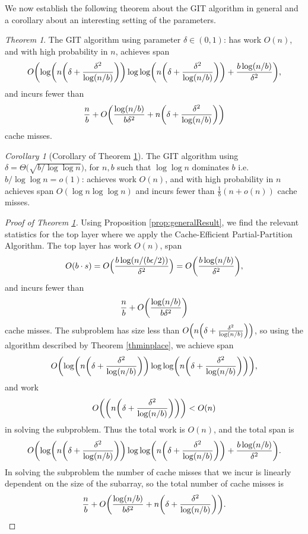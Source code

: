 \documentclass[sigconf]{acmart}
\DeclarePairedDelimiter{\paren}{(}{)}
\theoremstyle{remark}
\newtheorem{theorem}{Theorem}[section]
\newtheorem{corollary}[thm]{Corollary}
\theoremstyle{remark}
\begin{document}
We now establish the following theorem about the GIT algorithm in general and a corollary about an interesting setting of the parameters.
\begin{theorem}
	\label{thm:GIT}
	The GIT algorithm using parameter $\delta\in(0,1)$: has work $O(n)$, and with high probability in $n$, achieves span $$O\paren*{\log \paren*{n\paren*{\delta+\frac{\delta^2}{\log (n/b)}}} \log\log \paren*{n\paren*{\delta+\frac{\delta^2}{\log (n/b)}}} +\frac{b\log (n/b)}{\delta^2}},$$
and incurs fewer than 
	$$\frac{n}{b}+O\paren*{\frac{\log (n/b)}{b\delta^2} + n\paren*{\delta+\frac{\delta^2}{\log (n/b)}}}$$
cache misses.
\end{theorem}
\begin{corollary}[Corollary of Theorem \ref{thm:GIT}]
	\label{cor:GIT}
	The GIT algorithm using $\delta = \Theta\Big(\sqrt{b/\log\log n}\Big)$, for $n,b$ such that $\log \log n$ dominates $b$ i.e.  $b/\log\log n = o(1)$: achieves work $O(n)$, and with high probability in $n$ achieves span $O(\log n \log\log n)$ and incurs fewer than $\frac{1}{b}(n+o(n))$ cache misses.
\end{corollary}
\begin{proof}[Proof of Theorem \ref{thm:GIT}]
	Using Proposition \ref{prop:generalResult}, we find the relevant statistics for the top layer where we apply the Cache-Efficient Partial-Partition Algorithm. 
	The top layer has work $O(n)$, span 
	$$O(b\cdot s) = O\Big(\frac{b\log(n/(b\epsilon/2))}{\delta^2}\Big)=O\paren*{\frac{b\log(n/b)}{\delta^2}},$$ and incurs fewer than 
	$$\frac{n}{b}+O\paren*{\frac{\log (n/b)}{b\delta^2}}$$ 
	cache misses.
	The subproblem has size less than $O\paren*{n\paren*{\delta+\frac{\delta^2}{\log (n/b)}}}$, so using the algorithm described by Theorem \ref{thminplace}, we achieve span
	$$O\paren*{\log \paren*{n\paren*{\delta+\frac{\delta^2}{\log (n/b)}}} \log\log \paren*{n\paren*{\delta+\frac{\delta^2}{\log (n/b)}}}},$$
	and work $$O\paren*{\paren*{n\paren*{\delta+\frac{\delta^2}{\log (n/b)}}}} < O(n)$$
	in solving the subproblem.
	Thus the total work is $O(n)$, and the total span is $$O\paren*{\log \paren*{n\paren*{\delta+\frac{\delta^2}{\log (n/b)}}} \log\log \paren*{n\paren*{\delta+\frac{\delta^2}{\log (n/b)}}} +\frac{b\log (n/b)}{\delta^2}}.$$
	In solving the subproblem the number of cache misses that we incur is linearly dependent on the size of the subarray, so the total number of cache misses is $$\frac{n}{b}+O\paren*{\frac{\log (n/b)}{b\delta^2}  +n\paren*{\delta+\frac{\delta^2}{\log (n/b)}}}.$$ 
\end{proof}
\end{document}
